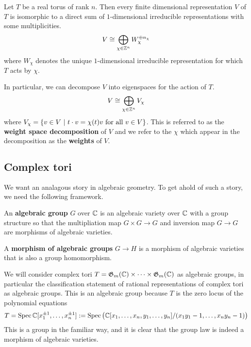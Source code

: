 \documentclass[12pt]{article}
\begin{document}
\begin{theorem}
    Let $T$ be a real torus of rank $n$. Then every finite dimensional representation $V$ of $T$ is isomorphic 
    to a direct sum of $1$-dimensional irreducible representations with some multiplicities.
    \begin{align*}
        V \cong \bigoplus_{\chi\in \mathbb{Z}^n} W_\chi^{\oplus n_\chi}
    \end{align*} where $W_\chi$ denotes the unique $1$-dimensional irreducible representation for which $T$ acts by $\chi$.
\end{theorem}

In particular, we can decompose $V$ into eigenspaces for the action of $T$. \begin{align*}
    V \cong \bigoplus_{\chi\in\mathbb{Z}^n} V_\chi
\end{align*} where $V_\chi = \{v\in V \ \vert \  t\cdot v = \chi(t)v \text{ for all $v\in V$}\}$. This is
referred to as the \textbf{weight space decomposition} of $V$ and we refer to the $\chi$ which appear in 
the decomposition as the \textbf{weights} of $V$.


\subsection{Complex tori}
We want an analagous story in algebraic geometry. To get ahold of such a story, 
we need the following framework.
\begin{definition}
    An \textbf{algebraic group} $G$ over $\mathbb{C}$ is an algebraic variety over $\mathbb{C}$ with a group structure
    so that the multipliation map $G\times G\to G$ and inversion map $G\to G$ are morphisms
    of algebraic varieties.
\end{definition}

\begin{definition}
    A \textbf{morphism of algebraic groups} $G\to H$ is a morphism of algebraic varieties that is also a group homomorphism.
\end{definition}

We will consider complex tori $T = \mathfrak{G}_m(\mathbb{C})\times\cdots\times\mathfrak{G}_m(\mathbb{C})$ as algebraic groups, 
in particular the classification statement of rational representations of complex tori 
as algebraic groups. This is an algebraic group because $T$ is the zero locus of 
the polynomial equations \begin{align*}
    T = \operatorname{Spec} \mathbb{C}[x_1^{\pm 1},\ldots, x_n^{\pm 1}] := \operatorname{Spec}\big(\mathbb{C}[x_1,\dots,x_n,y_1,\dots,y_n]/(x_1y_1-1,\dots,x_ny_n-1)\big)
\end{align*} This is a group in the familiar way, and it is clear that the group law is indeed a morphism of algebraic varieties.
\end{document}
